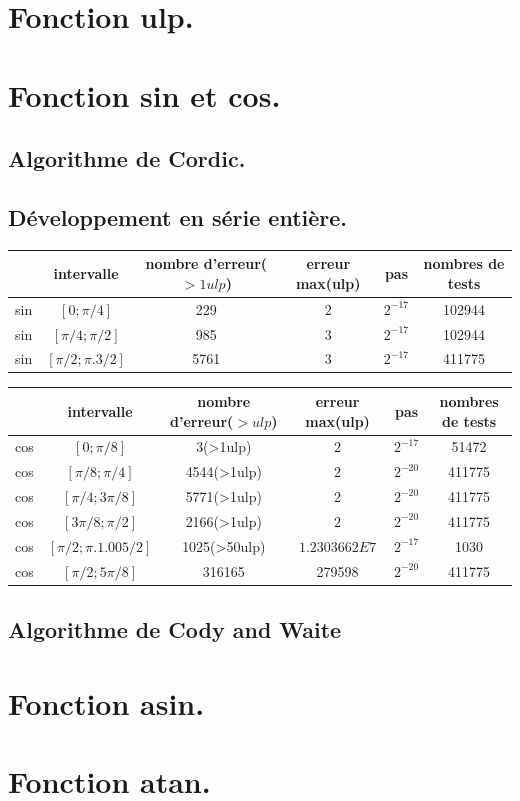 \documentclass[a4,12pt]{article}
\begin{document}
\section{Fonction ulp.}
\section{Fonction sin et cos.}
\subsection{Algorithme de Cordic.}
\subsection{Développement en série entière.}

\begin{tabular}{|c|c|c|c|c|c|}

\hline 
 & intervalle & nombre d'erreur($ > 1 ulp$) & erreur max(ulp) & pas & nombres de tests \\
\hline 
sin & $[0;\pi /4]$ & 229 & $2$ & $2^{-17}$ & 102944\\
\hline
sin & $[\pi /4;\pi /2]$ & 985 & $3$ & $2^{-17}$ & 102944\\
\hline
sin & $[\pi /2;\pi .3/2]$ & 5761 & $3$ & $2^{-17}$ & 411775\\
\hline
\end{tabular}

\begin{tabular}{|c|c|c|c|c|c|}

\hline 
 & intervalle & nombre d'erreur($ >  ulp$) & erreur max(ulp) & pas & nombres de tests \\
\hline
cos & $[0;\pi /8]$ & 3(>1ulp) & $2$ & $2^{-17}$ & 51472\\
\hline
cos & $[\pi /8;\pi /4]$ & 4544(>1ulp) & $2$ & $2^{-20}$ & 411775\\
\hline
cos & $[\pi /4;3\pi /8]$ & 5771(>1ulp) & $2$ & $2^{-20}$ & 411775\\
\hline
cos & $[3\pi /8;\pi /2]$ & 2166(>1ulp) & $2$ & $2^{-20}$ & 411775\\
\hline
cos & $[\pi /2;\pi .1.005/2]$ & 1025(>50ulp) & $1.2303662E7$ & $2^{-17}$ & 1030\\
\hline
cos & $[\pi /2;5\pi /8]$ & 316165 & 279598 & $2^{-20}$ & 411775\\
\hline
\end{tabular}


\subsection{Algorithme de Cody and Waite}
\section{Fonction asin.}
\section{Fonction atan.}
\end{document}
